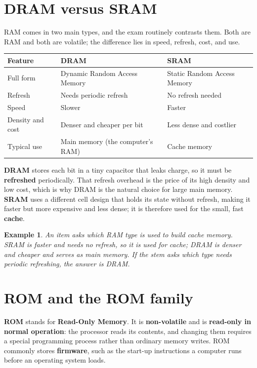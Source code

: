 \documentclass[11pt]{article}
\newtheorem{example}{Example}[section]
\begin{document}
\section{DRAM versus SRAM}
RAM comes in two main types, and the exam routinely contrasts them. Both are
RAM and both are volatile; the difference lies in speed, refresh, cost, and
use.

\begin{center}
\begin{tabular}{p{}p{}p{}}
\toprule
\textbf{Feature} & \textbf{DRAM} & \textbf{SRAM}\\
\midrule
Full form & Dynamic Random Access Memory & Static Random Access Memory\\
Refresh & Needs periodic refresh & No refresh needed\\
Speed & Slower & Faster\\
Density and cost & Denser and cheaper per bit & Less dense and costlier\\
Typical use & Main memory (the computer's RAM) & Cache memory\\
\bottomrule
\end{tabular}
\end{center}

\textbf{DRAM} stores each bit in a tiny capacitor that leaks charge, so it
must be \textbf{refreshed} periodically. That refresh overhead is the price
of its high density and low cost, which is why DRAM is the natural choice
for large main memory. \textbf{SRAM} uses a different cell design that holds
its state without refresh, making it faster but more expensive and less
dense; it is therefore used for the small, fast \textbf{cache}.

\begin{example}
An item asks which RAM type is used to build cache memory. SRAM is faster
and needs no refresh, so it is used for cache; DRAM is denser and cheaper
and serves as main memory. If the stem asks which type needs periodic
refreshing, the answer is DRAM.
\end{example}

\section{ROM and the ROM family}
\textbf{ROM} stands for \textbf{Read-Only Memory}. It is \textbf{non-volatile}
and is \textbf{read-only in normal operation}: the processor reads its
contents, and changing them requires a special programming process rather
than ordinary memory writes. ROM commonly stores \textbf{firmware}, such as
the start-up instructions a computer runs before an operating system loads.
\end{document}

